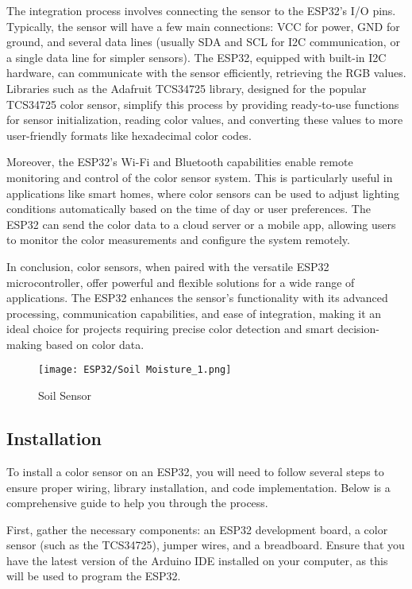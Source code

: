 The integration process involves connecting the sensor to the ESP32's I/O pins. Typically, the sensor will have a few main connections: VCC for power, GND for ground, and several data lines (usually SDA and SCL for I2C communication, or a single data line for simpler sensors). The ESP32, equipped with built-in I2C hardware, can communicate with the sensor efficiently, retrieving the RGB values. Libraries such as the Adafruit TCS34725 library, designed for the popular TCS34725 color sensor, simplify this process by providing ready-to-use functions for sensor initialization, reading color values, and converting these values to more user-friendly formats like hexadecimal color codes.

Moreover, the ESP32's Wi-Fi and Bluetooth capabilities enable remote monitoring and control of the color sensor system. This is particularly useful in applications like smart homes, where color sensors can be used to adjust lighting conditions automatically based on the time of day or user preferences. The ESP32 can send the color data to a cloud server or a mobile app, allowing users to monitor the color measurements and configure the system remotely.

In conclusion, color sensors, when paired with the versatile ESP32 microcontroller, offer powerful and flexible solutions for a wide range of applications. The ESP32 enhances the sensor's functionality with its advanced processing, communication capabilities, and ease of integration, making it an ideal choice for projects requiring precise color detection and smart decision-making based on color data.

\begin{figure}  
	\begin{center}
		\texttt{[image: ESP32/Soil Moisture\_1.png]}
		\caption{Soil Sensor } 
		\label{fig:Python 3.10.}
	\end{center}
\end{figure}	

\subsection{Installation}
To install a color sensor on an ESP32, you will need to follow several steps to ensure proper wiring, library installation, and code implementation. Below is a comprehensive guide to help you through the process.

First, gather the necessary components: an ESP32 development board, a color sensor (such as the TCS34725), jumper wires, and a breadboard. Ensure that you have the latest version of the Arduino IDE installed on your computer, as this will be used to program the ESP32.


